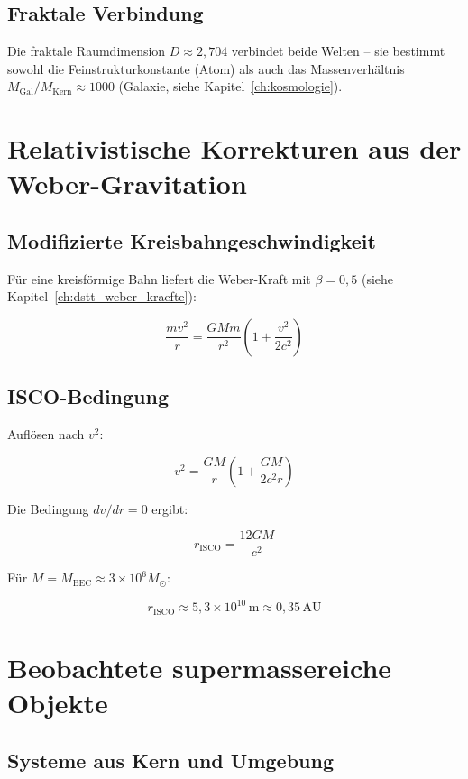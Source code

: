\subsection{Fraktale Verbindung}
\label{sub:bec_fraktale_verbindung}

Die fraktale Raumdimension \( D \approx 2,704 \) verbindet beide Welten – sie bestimmt sowohl die Feinstrukturkonstante (Atom) als auch das Massenverhältnis \( M_{\text{Gal}} / M_{\text{Kern}} \approx 1000 \) (Galaxie, siehe Kapitel~\ref{ch:kosmologie}).

\section{Relativistische Korrekturen aus der Weber-Gravitation}
\label{app:bec_relativistik}

\subsection{Modifizierte Kreisbahngeschwindigkeit}
\label{sub:bec_kreisbahn}

Für eine kreisförmige Bahn liefert die Weber-Kraft mit \( \beta = 0,5 \) (siehe Kapitel~\ref{ch:dstt_weber_kraefte}):

\[
\frac{mv^2}{r} = \frac{GMm}{r^2} \left( 1 + \frac{v^2}{2c^2} \right) \tag{K.21}
\]

\subsection{ISCO-Bedingung}
\label{sub:bec_isco}

Auflösen nach \( v^2 \):

\[
v^2 = \frac{GM}{r} \left( 1 + \frac{GM}{2c^2 r} \right) \tag{K.22}
\]

Die Bedingung \( dv/dr = 0 \) ergibt:

\[
r_{\text{ISCO}} = \frac{12GM}{c^2} \tag{K.23}
\]

Für \( M = M_{\text{BEC}} \approx 3 \times 10^6 M_{\odot} \):

\[
r_{\text{ISCO}} \approx 5,3 \times 10^{10} \, \text{m} \approx 0,35 \, \text{AU}
\]

\section{Beobachtete supermassereiche Objekte}
\label{app:bec_beobachtung}

\subsection{Systeme aus Kern und Umgebung}
\label{sub:bec_systeme}

